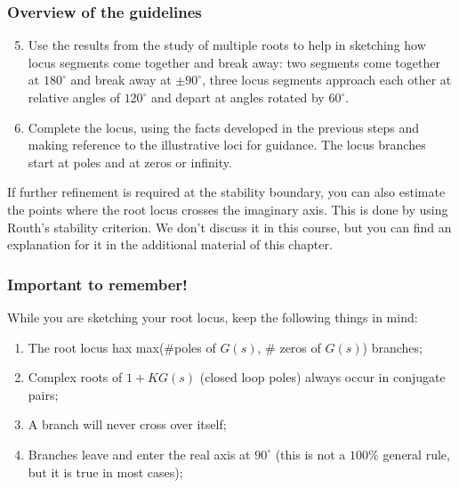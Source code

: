 \begin{frame}
	\frametitle{Overview of the guidelines}
	\begin{block}{}
		\begin{enumerate}
			\setcounter{enumi}{4}
			\item Use the results from the study of multiple roots to help in sketching how locus segments come together and break away: two segments come together at $180^{\circ}$ and break away at $\pm 90^{\circ}$, three locus segments approach each other at relative angles of $120^{\circ}$ and depart at angles rotated by $60^{\circ}$.
			\item Complete the locus, using the facts developed in the previous steps and making reference to the illustrative loci for guidance. The locus branches start at poles and at zeros or infinity.
		\end{enumerate}
	\end{block}
		If further refinement is required at the stability boundary, you can also estimate the points where the root locus crosses the imaginary axis. This is done by using Routh's stability criterion. We don't discuss it in this course, but you can find an explanation for it in the additional material of this chapter.  
\end{frame}

\begin{frame}
\frametitle{Important to remember!}
	\begin{alertblock}{}
		While you are sketching your root locus, keep the following things in mind:
		\begin{enumerate}
			\item The root locus hax max($\#$poles of $G(s)$, $\#$ zeros of $G(s)$) branches;
			\item Complex roots of $1 + KG(s)$ (closed loop poles) always occur in conjugate pairs;
			\item A branch will never cross over itself;
			\item Branches leave and enter the real axis at $90^{\circ}$ (this is not a $100\%$ general rule, but it is true in most cases);
		\end{enumerate}
	\end{alertblock}
\end{frame}

